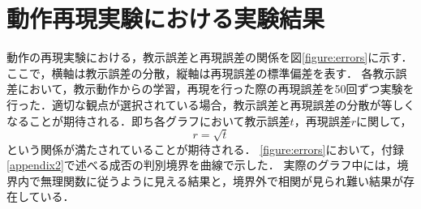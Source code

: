 \chapter{動作再現実験における実験結果}\label{appendix1}

動作の再現実験における，教示誤差と再現誤差の関係を図\ref{figure:errors}に示す．
ここで，横軸は教示誤差の分散，縦軸は再現誤差の標準偏差を表す．
各教示誤差において，教示動作からの学習，再現を行った際の再現誤差を50回ずつ実験を行った．適切な観点が選択されている場合，教示誤差と再現誤差の分散が等しくなることが期待される．即ち各グラフにおいて教示誤差$t$，再現誤差$r$に関して，
\[
	r = \sqrt{t}
\]
という関係が満たされていることが期待される．
\ref{figure:errors}において，付録\ref{appendix2}で述べる成否の判別境界を曲線で示した．
実際のグラフ中には，境界内で無理関数に従うように見える結果と，境界外で相関が見られ難い結果が存在している．
